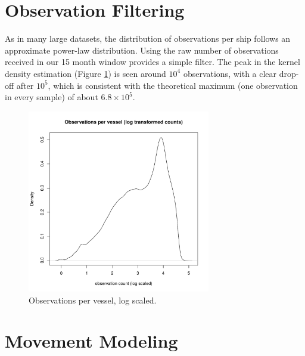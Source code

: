 \section{Observation Filtering}
As in many large datasets, the distribution of observations per ship follows an approximate power-law distribution. Using the raw number of observations received in our 15 month window provides a simple filter. The peak in the kernel density estimation (Figure \ref{fig:obs-per-vessel-log}) is seen around $10^4$ observations, with a clear drop-off after $10^5$, which is consistent with the theoretical maximum (one observation in every sample) of about $6.8 \times 10^5$.
\begin{figure}[htbp]
  \centering
  \includegraphics[width=80mm]{figures/obs-per-vessel-log.pdf}
  \caption[Observations per vessel]{Observations per vessel, log scaled.}
  \label{fig:obs-per-vessel-log}
\end{figure}

\section{Movement Modeling}
\label{sec:movement-modeling-appendix}


